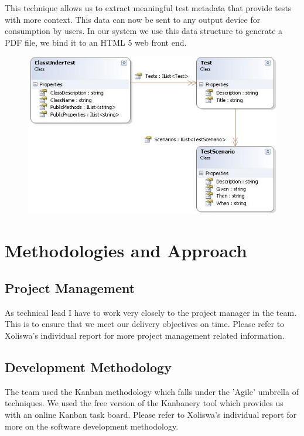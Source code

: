 \documentclass[a4paper,12pt]{article}
\begin{document}
This technique allows us to extract meaningful test metadata that provide tests with more context. This data can now be sent to any output device for consumption by users. In our system we use this data structure to generate a PDF file, we bind it to an HTML 5 web front end.

\begin{center}
	\begin{figure}
		\includegraphics{classdiagram.jpg}
			\caption{}	 
			\label{fig1}    
	\end{figure}	
\end{center}



\section{Methodologies and Approach}
\subsection{Project Management}
As technical lead I have to work very closely to the project manager in the team. This is to ensure that we meet our delivery objectives on time. Please refer to Xoliswa's individual\cite{xoli} report for more project management related information. 
\subsection{Development Methodology}
The team used the Kanban methodology which falls under the 'Agile' umbrella of techniques. We used the free version of the Kanbanery\cite{kanban} tool which provides us with an online Kanban task board. Please refer to Xoliswa's individual report\cite{xoli} for more on the software development methodology.
\end{document}
